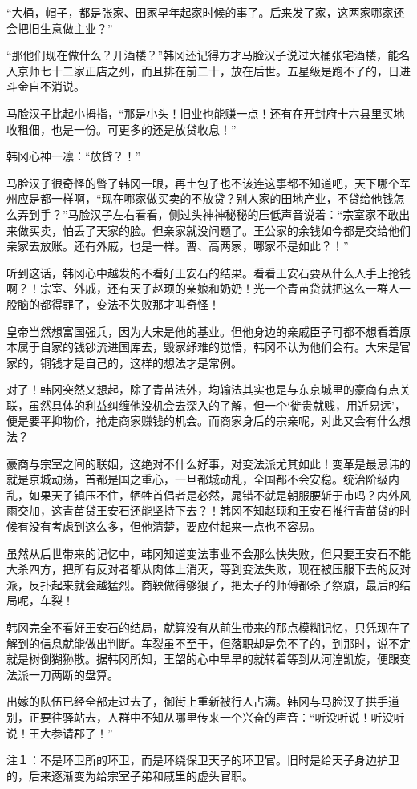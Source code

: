 “大桶，帽子，都是张家、田家早年起家时候的事了。后来发了家，这两家哪家还会把旧生意做主业？”

“那他们现在做什么？开酒楼？”韩冈还记得方才马脸汉子说过大桶张宅酒楼，能名入京师七十二家正店之列，而且排在前二十，放在后世。五星级是跑不了的，日进斗金自不消说。

马脸汉子比起小拇指，“那是小头！旧业也能赚一点！还有在开封府十六县里买地收租佃，也是一份。可更多的还是放贷收息！”

韩冈心神一凛：“放贷？！”

马脸汉子很奇怪的瞥了韩冈一眼，再土包子也不该连这事都不知道吧，天下哪个军州应是都一样啊，“现在哪家做买卖的不放贷？别人家的田地产业，不贷给他钱怎么弄到手？”马脸汉子左右看看，侧过头神神秘秘的压低声音说着：“宗室家不敢出来做买卖，怕丢了天家的脸。但亲家就没问题了。王公家的余钱如今都是交给他们亲家去放账。还有外戚，也是一样。曹、高两家，哪家不是如此？！”

听到这话，韩冈心中越发的不看好王安石的结果。看看王安石要从什么人手上抢钱啊？！宗室、外戚，还有天子赵顼的亲娘和奶奶！光一个青苗贷就把这么一群人一股脑的都得罪了，变法不失败那才叫奇怪！

皇帝当然想富国强兵，因为大宋是他的基业。但他身边的亲戚臣子可都不想看着原本属于自家的钱钞流进国库去，毁家纾难的觉悟，韩冈不认为他们会有。大宋是官家的，铜钱才是自己的，这样的想法才是常例。

对了！韩冈突然又想起，除了青苗法外，均输法其实也是与东京城里的豪商有点关联，虽然具体的利益纠缠他没机会去深入的了解，但一个‘徙贵就贱，用近易远’，便是要平抑物价，抢走商家赚钱的机会。而商家身后的宗亲呢，对此又会有什么想法？

豪商与宗室之间的联姻，这绝对不什么好事，对变法派尤其如此！变革是最忌讳的就是京城动荡，首都是国之重心，一旦都城动乱，全国都不会安稳。统治阶级内乱，如果天子镇压不住，牺牲首倡者是必然，晁错不就是朝服腰斩于市吗？内外风雨交加，这青苗贷王安石还能坚持下去？！韩冈不知赵顼和王安石推行青苗贷的时候有没有考虑到这么多，但他清楚，要应付起来一点也不容易。

虽然从后世带来的记忆中，韩冈知道变法事业不会那么快失败，但只要王安石不能大杀四方，把所有反对者都从肉体上消灭，等到变法失败，现在被压服下去的反对派，反扑起来就会越猛烈。商鞅做得够狠了，把太子的师傅都杀了祭旗，最后的结局呢，车裂！

韩冈完全不看好王安石的结局，就算没有从前生带来的那点模糊记忆，只凭现在了解到的信息就能做出判断。车裂虽不至于，但落职却是免不了的，到那时，说不定就是树倒猢狲散。据韩冈所知，王韶的心中早早的就转着等到从河湟凯旋，便跟变法派一刀两断的盘算。

出嫁的队伍已经全部走过去了，御街上重新被行人占满。韩冈与马脸汉子拱手道别，正要往驿站去，人群中不知从哪里传来一个兴奋的声音：“听没听说！听没听说！王大参请郡了！”

注１：不是环卫所的环卫，而是环绕保卫天子的环卫官。旧时是给天子身边护卫的，后来逐渐变为给宗室子弟和戚里的虚头官职。

